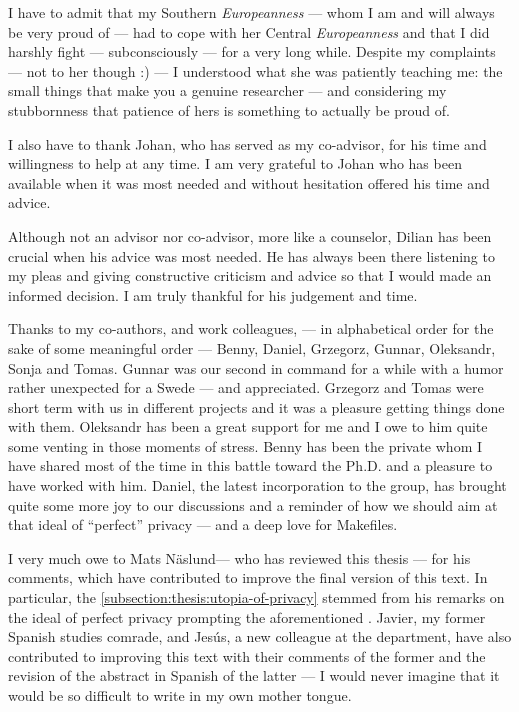 I have to admit that my Southern \emph{Europeanness} --- whom I am and will always 
be very proud of --- had to cope with her Central \emph{Europeanness} and that I 
did harshly fight --- subconsciously --- for a very long while. Despite my complaints 
--- not to her though :) --- I understood what she was patiently teaching me: the 
small things that make you a genuine researcher --- and considering my stubbornness 
that patience of hers is something to actually be proud of.

I also have to thank Johan, who has served as my co-advisor, for his time and willingness 
to help at any time. I am very grateful to Johan who has been available when it 
was most needed and without hesitation offered his time and advice. 

Although not an advisor nor co-advisor, more like a counselor, Dilian has been crucial 
when his advice was most needed. He has always been there listening to my pleas 
and giving constructive criticism and advice so that I would made an informed decision. 
I am truly thankful for his judgement and time.

Thanks to my co-authors, and work colleagues, --- in alphabetical order for the 
sake of some meaningful order --- Benny, Daniel, Grzegorz, Gunnar, Oleksandr, Sonja 
and Tomas. Gunnar was our second in command for a while with a humor rather unexpected 
for a Swede --- and appreciated. Grzegorz and Tomas were short term with us in different 
projects and it was a pleasure getting things done with them. Oleksandr has been 
a great support for me and I owe to him quite some venting in those moments of stress. 
Benny has been the private whom I have shared most of the time in this battle toward 
the Ph.D. and a pleasure to have worked with him. Daniel, the latest incorporation 
to the group, has brought quite some more joy to our discussions and a reminder 
of how we should aim at that ideal of ``perfect'' privacy --- and a deep love for 
Makefiles.

I very much owe to Mats N\"{a}slund--- who has reviewed this thesis --- for his 
comments, which have contributed to improve the final version of this text. In particular, 
the  \cref{subsection:thesis:utopia-of-privacy} 
stemmed from his remarks on the ideal of perfect privacy prompting the aforementioned 
. Javier, my former Spanish studies 
comrade, and Jes\'{u}s, a new colleague at the department, have also contributed 
to improving this text with their comments of the former and the revision of the 
abstract in Spanish of the latter --- I would never imagine that it would be so 
difficult to write in my own mother tongue.

